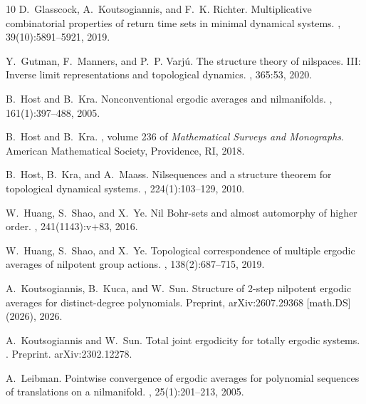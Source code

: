 \documentclass[11pt,reqno]{amsart}
\theoremstyle{definition}
\theoremstyle{remark}
\begin{document}
\begin{thebibliography}{10}
D.~Glasscock, A.~Koutsogiannis, and F.~K. Richter.
\newblock Multiplicative combinatorial properties of return time sets in minimal dynamical systems.
, 39(10):5891--5921, 2019.

Y.~Gutman, F.~Manners, and P.~P. Varj{\'u}.
\newblock The structure theory of nilspaces. {III}: {Inverse} limit representations and topological dynamics.
, 365:53, 2020.

B.~Host and B.~Kra.
\newblock Nonconventional ergodic averages and nilmanifolds.
, 161(1):397--488, 2005.

B.~Host and B.~Kra.
, volume 236 of {\em Mathematical Surveys and Monographs}.
\newblock American Mathematical Society, Providence, RI, 2018.

B.~Host, B.~Kra, and A.~Maass.
\newblock Nilsequences and a structure theorem for topological dynamical systems.
, 224(1):103--129, 2010.

W.~Huang, S.~Shao, and X.~Ye.
\newblock Nil {B}ohr-sets and almost automorphy of higher order.
, 241(1143):v+83, 2016.

W.~Huang, S.~Shao, and X.~Ye.
\newblock Topological correspondence of multiple ergodic averages of nilpotent group actions.
, 138(2):687--715, 2019.

A.~Koutsogiannis, B.~Kuca, and W.~Sun.
\newblock Structure of 2-step nilpotent ergodic averages for distinct-degree polynomials.
\newblock Preprint, {arXiv}:2607.29368 [math.{DS}] (2026), 2026.

A.~Koutsogiannis and W.~Sun.
\newblock Total joint ergodicity for totally ergodic systems.
.
\newblock Preprint. arXiv:2302.12278.

A.~Leibman.
\newblock Pointwise convergence of ergodic averages for polynomial sequences of translations on a nilmanifold.
, 25(1):201--213, 2005.


\end{thebibliography}
\end{document}
